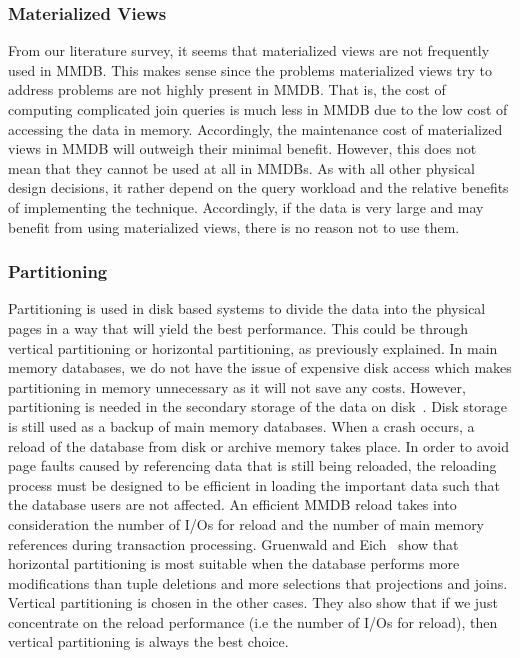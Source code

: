 \documentclass[12pt,a4paper]{article}
\begin{document}
\subsubsection{Materialized Views}
From our literature survey, it seems that materialized views are not frequently used in MMDB. This makes sense since the problems materialized views try to
address problems are not highly present in MMDB. That is, the cost of computing complicated join queries is much less in MMDB due to the low cost of accessing
the data in memory. Accordingly, the maintenance cost of materialized views in MMDB will outweigh their minimal benefit. However, this does not mean that they
cannot be used at all in MMDBs. As with all other physical design decisions, it rather depend on the query workload and the relative benefits of implementing
the technique. Accordingly, if the data is very large and may benefit from using materialized views, there is no reason not to use them.

\subsubsection{Partitioning}

Partitioning is used in disk based systems to divide the data into the physical pages in a way that will yield the best performance. This could be through
vertical partitioning or horizontal partitioning, as previously explained. In main memory databases, we do not have the issue of expensive disk access which
makes partitioning in memory unnecessary as it will not save any costs. However, partitioning is needed in the secondary storage of the data on
disk~\cite{gruenwald1990database}. Disk storage is still used as a backup of main memory databases. When a crash occurs, a reload of the database from disk or
archive memory takes place. In order to avoid page faults caused by referencing data that is still being reloaded, the reloading process must be designed to be
efficient in loading the important data such that the database users are not affected. An efficient MMDB reload takes into consideration the number of I/Os for
reload and the number of main memory references during transaction processing. Gruenwald and Eich~\cite{gruenwald1990database,gruenwald1990choosing} show that
horizontal partitioning is most suitable when the database performs more modifications than tuple deletions and more selections that projections and joins.
Vertical partitioning is chosen in the other cases. They also show that if we just concentrate on the reload performance (i.e the number of I/Os for
reload), then vertical partitioning is always the best choice. 
\end{document}
